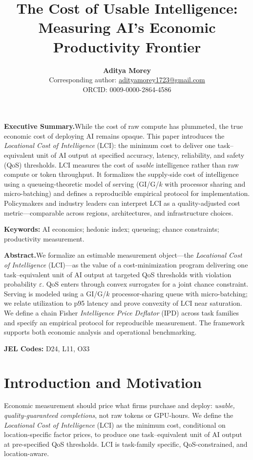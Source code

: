 \documentclass[12pt]{article}
\title{The Cost of Usable Intelligence: Measuring AI’s Economic Productivity Frontier}
\author{\textbf{Aditya Morey}\\
\small Corresponding author: \href{mailto:adityamorey1723@gmail.com}{adityamorey1723@gmail.com}\\
\small ORCID: 0009-0000-2864-4586}
\date{}
\numberwithin{equation}{section}
\theoremstyle{definition}
\theoremstyle{plain}
\begin{document}
\maketitle
\thispagestyle{plain}

\noindent\textbf{Executive Summary.}\;\;While the cost of raw compute has plummeted, the true economic cost of deploying AI remains opaque. This paper introduces the \emph{Locational Cost of Intelligence} (LCI): the minimum cost to deliver one task–equivalent unit of AI output at specified accuracy, latency, reliability, and safety (QoS) thresholds. LCI measures the cost of \emph{usable} intelligence rather than raw compute or token throughput. It formalizes the supply-side cost of intelligence using a queueing-theoretic model of serving (GI/G/$k$ with processor sharing and micro-batching) and defines a reproducible empirical protocol for implementation. Policymakers and industry leaders can interpret LCI as a quality-adjusted cost metric—comparable across regions, architectures, and infrastructure choices.

\vspace{0.6em}
\noindent\textbf{Keywords:} AI economics; hedonic index; queueing; chance constraints; productivity measurement.

\newpage

\noindent\textbf{Abstract.}\;\;We formalize an estimable measurement object—the \emph{Locational Cost of Intelligence} (LCI)—as the value of a cost-minimization program delivering one task–equivalent unit of AI output at targeted QoS thresholds with violation probability $\varepsilon$. QoS enters through convex surrogates for a joint chance constraint. Serving is modeled using a GI/G/$k$ processor-sharing queue with micro-batching; we relate utilization to p95 latency and prove convexity of LCI near saturation. We define a chain Fisher \emph{Intelligence Price Deflator} (IPD) across task families and specify an empirical protocol for reproducible measurement. The framework supports both economic analysis and operational benchmarking.

\vspace{0.3cm}
\noindent\textbf{JEL Codes:} D24, L11, O33

\newpage

\section{Introduction and Motivation}
Economic measurement should price what firms purchase and deploy: \emph{usable, quality-guaranteed completions}, not raw tokens or GPU-hours. We define the \emph{Locational Cost of Intelligence} (LCI) as the minimum cost, conditional on location-specific factor prices, to produce one task–equivalent unit of AI output at pre-specified QoS thresholds. LCI is task-family specific, QoS-constrained, and location-aware.
\end{document}
